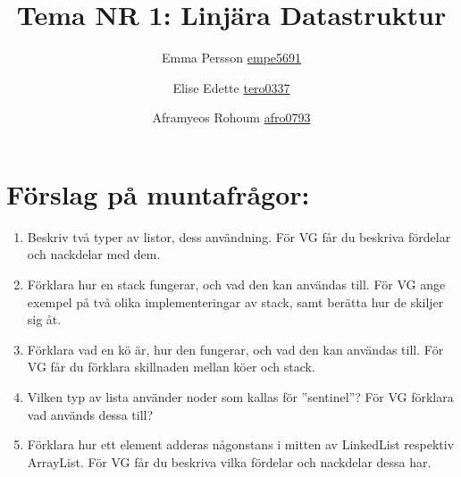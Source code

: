 \documentclass[a5paper,10pt,oneside]{article}
\title{Tema NR 1: Linjära Datastruktur}
\author{Emma Persson \url{empe5691} \and Elise Edette \url{tero0337} \and Aframyeos Rohoum \url{afro0793}}
\begin{document}
\maketitle


\section{Förslag på muntafrågor:}

\begin{enumerate}
\item Beskriv två typer av listor, dess användning. För VG får du beskriva fördelar och nackdelar med dem.

\item Förklara hur en stack fungerar, och vad den kan användas till. För VG ange exempel på två olika implementeringar av stack, samt berätta hur de skiljer sig åt.

\item Förklara vad en kö är, hur den fungerar, och vad den kan användas till. För VG får du förklara skillnaden mellan köer och stack.

\item Vilken typ av lista använder noder som kallas för ”sentinel”? För VG förklara vad används dessa till?

\item Förklara hur ett element adderas någonstans i mitten av LinkedList respektiv ArrayList. För VG får du  beskriva vilka fördelar och nackdelar dessa har. 
\end{enumerate}







%


%


%
%
\end{document}
